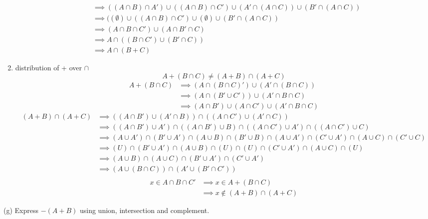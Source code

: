 \documentclass{article}
\begin{document}
\begin{enumerate}
\begin{align*}
        &\implies ((A \cap B) \cap A') \cup ((A \cap B) \cap C') \cup (A'\cap (A \cap C)) \cup (B' \cap (A \cap C))\\
        &\implies ((\emptyset) \cup ((A \cap B) \cap C') \cup (\emptyset) \cup (B' \cap (A \cap C))\\
        &\implies (A \cap B \cap C') \cup (A \cap B' \cap C)\\
        &\implies A \cap ((B \cap C') \cup (B' \cap C))\\
        &\implies  A \cap (B + C)
    \end{align*}
    \item distribution of + over $\cap$
    \begin{equation*}
        A + (B \cap C) \neq (A + B) \cap (A + C)
    \end{equation*}
    \begin{align*}
        A + (B \cap C) &\implies (A \cap (B \cap C)') \cup (A' \cap (B \cap C))\\
        &\implies (A\cap (B' \cup C')) \cup (A' \cap B \cap C)\\
        &\implies (A\cap B') \cup (A\cap C') \cup (A' \cap B \cap C)
    \end{align*}
    \begin{align*}
        (A + B) \cap (A + C) &\implies ((A \cap B')\cup(A'\cap B)) \cap ((A\cap C')\cup(A'\cap C))\\
        &\implies ((A \cap B')\cup A')\cap ((A \cap B')\cup B) \cap ((A\cap C')\cup A')\cap ((A\cap C')\cup C)\\
        &\implies (A \cup A') \cap (B' \cup A')\cap (A\cup B) \cap (B' \cup B) \cap (A \cup A') \cap (C' \cup A')\cap (A\cup C) \cap (C' \cup C)\\
        &\implies (U) \cap (B' \cup A')\cap (A\cup B) \cap (U) \cap (U) \cap (C' \cup A')\cap (A\cup C) \cap (U)\\
        &\implies (A\cup B) \cap (A\cup C) \cap (B' \cup A') \cap (C' \cup A')\\
        &\implies (A \cup (B \cap C)) \cap (A' \cup (B' \cap C'))\\
    \end{align*}
    \begin{align*}
        x \in A \cap B \cap C' &\implies x \in A+(B \cap C)\\
        &\implies x \notin (A + B) \cap (A + C)
    \end{align*}
\end{enumerate}
(g) Express $-(A+B)$ using union, intersection and complement.\\
\end{document}
